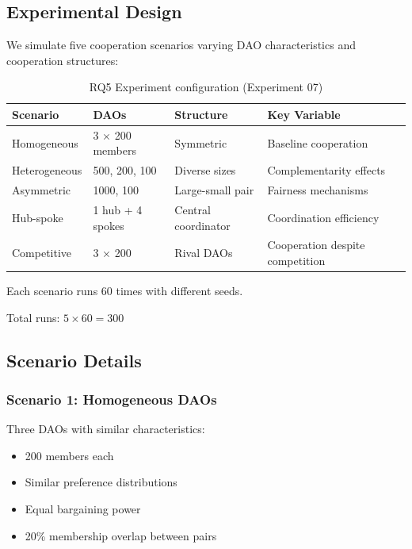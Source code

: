
\subsection{Experimental Design}

We simulate five cooperation scenarios varying DAO characteristics and cooperation structures:

\begin{table}[htbp]
\centering
\caption{RQ5 Experiment configuration (Experiment 07)}
\label{tab:rq5-experiment}
\begin{tabular}{@{}llll@{}}
\toprule
Scenario & DAOs & Structure & Key Variable \\
\midrule
Homogeneous & 3 $\times$ 200 members & Symmetric & Baseline cooperation \\
Heterogeneous & 500, 200, 100 & Diverse sizes & Complementarity effects \\
Asymmetric & 1000, 100 & Large-small pair & Fairness mechanisms \\
Hub-spoke & 1 hub + 4 spokes & Central coordinator & Coordination efficiency \\
Competitive & 3 $\times$ 200 & Rival DAOs & Cooperation despite competition \\
\bottomrule
\end{tabular}
\end{table}

Each scenario runs 60 times with different seeds.

Total runs: $5 \times 60 = 300$

\subsection{Scenario Details}

\subsubsection{Scenario 1: Homogeneous DAOs}

Three DAOs with similar characteristics:
\begin{itemize}
    \item 200 members each
    \item Similar preference distributions
    \item Equal bargaining power
    \item 20\% membership overlap between pairs
\end{itemize}

